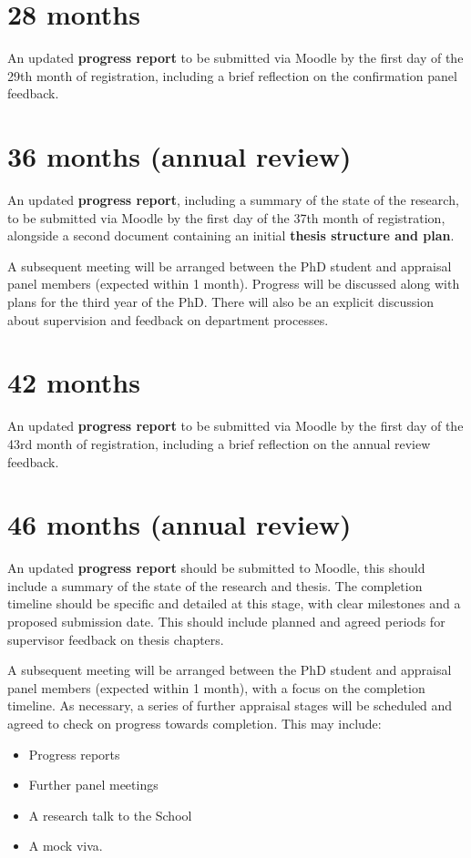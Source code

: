 \documentclass[12pt,a4paper]{article}
\begin{document}
\section{28 months}
An updated \textbf{progress report} to be submitted via Moodle by the first day of the 29th month of registration, including a brief reflection on the confirmation panel feedback.


\section{36 months (annual review)}
An updated \textbf{progress report}, including a summary of the state of the research, to be submitted via Moodle by the first day of the 37th month of registration, alongside a second document containing an initial \textbf{thesis structure and plan}.

A subsequent meeting will be arranged between the PhD student and appraisal panel members (expected within 1 month). Progress will be discussed along with plans for the third year of the PhD. There will also be an explicit discussion about supervision and feedback on department processes.


\section{42 months}
An updated \textbf{progress report} to be submitted via Moodle by the first day of the 43rd month of registration, including a brief reflection on the annual review feedback.


\section{46 months (annual review)}
An updated \textbf{progress report} should be submitted to Moodle, this should include a summary of the state of the research and thesis. The completion timeline should be specific and detailed at this stage, with clear milestones and a proposed submission date. This should include planned and agreed periods for supervisor feedback on thesis chapters.

A subsequent meeting will be arranged between the PhD student and appraisal panel members (expected within 1 month), with a focus on the completion timeline. As necessary, a series of further appraisal stages will be scheduled and agreed to check on progress towards completion. This may include:
\begin{itemize}
	\item Progress reports
	\item Further panel meetings
	\item A research talk to the School
	\item A mock viva.
\end{itemize}
\end{document}
